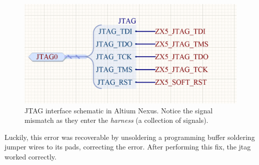 \begin{figure}[H]
    \centering
    \includegraphics[width=.85\textwidth]{media/jtag_error.png}
    \caption{JTAG interface schematic in Altium Nexus. Notice the signal mismatch as they enter the \emph{harness} (a collection of signals).}
    \label{fig:vcu20_soldered}
\end{figure}

Luckily, this error was recoverable by unsoldering a programming buffer soldering jumper wires to its pads, correcting the error. After performing this fix, the \acrshort{jtag} worked correctly. 


